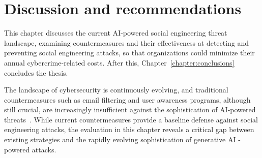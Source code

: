 

\chapter{Discussion and recommendations\label{chapter:discussion}}
\begin{comment}
- viimeisteltyä kirjakieltä, ei alan slangia. "does not", ei "doesn't"
- tietoturvakoulutus työajalla, EI omalla ajalla
- armeijassa saa vapaata hyvästä suorituksesta ammunnoissa. joku bonus gamifikaation kautta?
- employees can work from home, mention this? extra challenges for cybersecurity
- oman tietoturvatiimin tekemänä tai kolmannen osapuolen palveluna
- post-its and posters will likely be tuned out by the brain eventually. thus they must be kept fresh. luckily DALL-E can easily create such content, as often as needed
- orvot aliluvut merkki jäsentelyongelmasta, orvot luvunalotusrivit pakotetaan muun tekstin kanssa samalle sivulle
- muistuttamalla tärkeimmistä havainnoista luvun lopussa tavoitteeseen suhteutettuna
- Teknisten johtopäätösten tuoma impakti
- muistuttaa mieleen tutkimuskysymyksen, mainitsee tärkeimmät tulokset ja niiden perusteet
- keskittyy impaktiin ja esimerkiksi suosituksiin.
- ei pelkästään summeeraa luku kerrallaan aiempaa tekstiä
- As AI is developed further and the more its availability increases, the risk of malicious or criminal use increases as well
\end{comment}

This chapter discusses the current AI-powered social engineering threat landscape, examining countermeasures and their effectiveness at detecting and preventing social engineering attacks, so that organizations could minimize their annual cybercrime-related costs. After this, Chapter~\ref{chapter:conclusions} concludes the thesis.


The landscape of cybersecurity is continuously evolving, and traditional countermeasures such as email filtering and user awareness programs, although still crucial, are increasingly insufficient against the sophistication of AI-powered threats~\citep{fakhouri_AI_Driven_Solutions_SE_Attacks_2024}. While current countermeasures provide a baseline defense against social engineering attacks, the evaluation in this chapter reveals a critical gap between existing strategies and the rapidly evolving sophistication of generative AI -powered attacks. 


